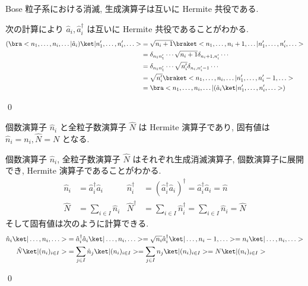 \documentclass[uplatex,dvipdfmx,a4paper,11pt]{jlreq}
\makeatletter
\numberwithin{equation}{section}
\theoremstyle{definition}
\renewenvironment{proof}[1][\proofname]{\par
  \normalfont
  \topsep6\p@\@plus6\p@ \trivlist
  \item[\hskip\labelsep{\bfseries #1}\@addpunct{\bfseries}]\ignorespaces\quad\par
}{
  \qed\endtrivlist\@endpefalse
}
\renewcommand\proofname{証明}
\makeatother
\begin{document}
\begin{proposition}[Q21-38(i)(ii)]
  Bose 粒子系における消滅, 生成演算子は互いに Hermite 共役である.
\end{proposition}
\begin{proof}
  次の計算により $\hat{a}_i, \hat{a}_i^\dagger$ は互いに Hermite 共役であることがわかる.
  \begin{align}
    (\bra<n_1,\ldots, n_i, \ldots|\hat{a}_i)\ket|n_1',\ldots, n_i', \ldots> & = \sqrt{n_i + 1}\braket<n_1,\ldots, n_i + 1, \ldots|n_1',\ldots, n_i', \ldots> \\
                                                                            & = \delta_{n_1n_1'}\cdots\sqrt{n_i + 1}\delta_{n_i+1,n_i'}\cdots                \\
                                                                            & = \delta_{n_1n_1'}\cdots\sqrt{n_i'}\delta_{n_i,n_i'-1}\cdots                   \\
                                                                            & = \sqrt{n_i'}\braket<n_1,\ldots, n_i, \ldots|n_1',\ldots, n_i' - 1, \ldots>    \\
                                                                            & = \bra<n_1,\ldots, n_i, \ldots|(\hat{a}_i\ket|n_1',\ldots, n_i', \ldots>)
  \end{align}
\end{proof}

\begin{proposition}[Q21-39(i)(ii)(iii)(iv)]
  個数演算子 $\hat{n}_i$ と全粒子数演算子 $\hat{N}$ は Hermite 演算子であり, 固有値は $\hat{n}_i = n_i, \hat{N} = N$ となる.
\end{proposition}
\begin{proof}
  個数演算子 $\hat{n}_i$, 全粒子数演算子 $\hat{N}$ はそれぞれ生成消滅演算子, 個数演算子に展開でき, Hermite 演算子であることがわかる.
  \begin{align}
    \hat{n}_i & = \hat{a}_i^\dagger\hat{a}_i & \hat{n}_i^\dagger & = (\hat{a}_i^\dagger\hat{a}_i)^\dagger = \hat{a}_i^\dagger\hat{a}_i = \hat{n} \\
    \hat{N}   & = \sum_{i\in I}\hat{n}_i     & \hat{N}^\dagger   & = \sum_{i\in I}\hat{n}_i^\dagger = \sum_{i\in I}\hat{n}_i = \hat{N}
  \end{align}
  そして固有値は次のように計算できる.
  \begin{align}
    \hat{n}_i\ket|\ldots,n_i,\ldots> & = \hat{a}_i^\dagger\hat{a}_i\ket|\ldots,n_i,\ldots> = \sqrt{n_i}\hat{a}_i^\dagger\ket|\ldots,n_i-1,\ldots> = n_i\ket|\ldots,n_i,\ldots> \\
    \hat{N}\ket|(n_i)_{i\in I}>      & = \sum_{j\in I}\hat{n}_j\ket|(n_i)_{i\in I}> = \sum_{j\in I}n_j\ket|(n_i)_{i\in I}> = N\ket|(n_i)_{i\in I}>
  \end{align}
\end{proof}
\end{document}
